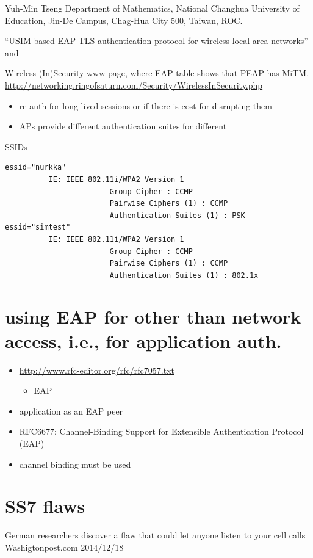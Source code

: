 \documentclass[12pt,a4paper,english]{tutthesis}
\begin{document}
Yuh-Min Tseng Department of Mathematics, National Changhua University of Education,
Jin-De Campus, Chag-Hua City 500, Taiwan, ROC.

``USIM-based EAP-TLS authentication protocol for
wireless local area networks''
and 

Wireless (In)Security www-page, where 
EAP table shows that PEAP has MiTM.
\url{http://networking.ringofsaturn.com/Security/WirelessInSecurity.php}

\begin{itemize}
\item re-auth for long-lived sessions or if there is cost for disrupting them
\item APs provide different authentication suites for different
\end{itemize}
SSIDs 

\scriptsize
\begin{verbatim}
essid="nurkka"
          IE: IEEE 802.11i/WPA2 Version 1
                        Group Cipher : CCMP
                        Pairwise Ciphers (1) : CCMP
                        Authentication Suites (1) : PSK
essid="simtest"
          IE: IEEE 802.11i/WPA2 Version 1
                        Group Cipher : CCMP
                        Pairwise Ciphers (1) : CCMP
                        Authentication Suites (1) : 802.1x
\end{verbatim}
\normalsize

\section{using EAP for other than network access, i.e., for application auth.}
\label{sec-8-2}
\begin{itemize}
\item \url{http://www.rfc-editor.org/rfc/rfc7057.txt}
\begin{itemize}
\item EAP
\end{itemize}
\item application as an EAP peer
\item RFC6677: Channel-Binding Support for Extensible Authentication Protocol (EAP)
\item channel binding must be used
\end{itemize}

\section{SS7 flaws}
\label{sec-8-3}
German researchers discover a flaw that could let anyone listen to
your cell calls 
Washigtonpost.com 2014/12/18
\end{document}
